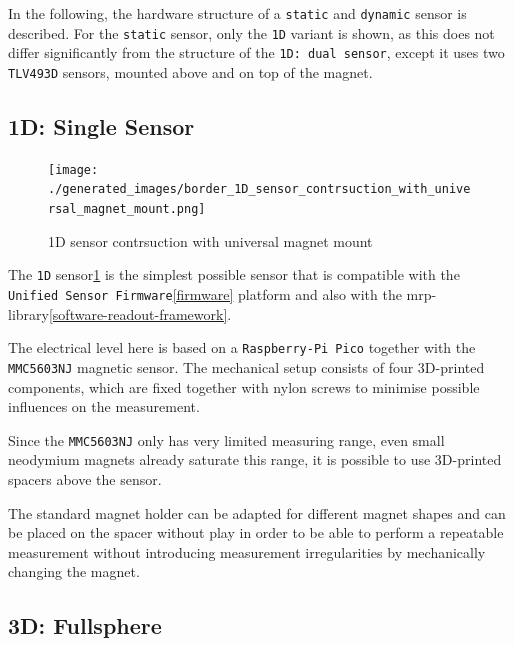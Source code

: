 In the following, the hardware structure of a
\passthrough{\lstinline!static!} and \passthrough{\lstinline!dynamic!}
sensor is described. For the \passthrough{\lstinline!static!} sensor,
only the \passthrough{\lstinline!1D!} variant is shown, as this does not
differ significantly from the structure of the
\passthrough{\lstinline!1D: dual sensor!}, except it uses two
\passthrough{\lstinline!TLV493D!} sensors, mounted above and on top of
the magnet.

\hypertarget{d-single-sensor}{%
\subsection{1D: Single Sensor}\label{d-single-sensor}}

\begin{figure}
\centering
\texttt{[image: ./generated\_images/border\_1D\_sensor\_contrsuction\_with\_universal\_magnet\_mount.png]}
\caption{1D sensor contrsuction with universal magnet mount
\label{1D_sensor_contrsuction_with_universal_magnet_mount.png}}
\end{figure}

The \passthrough{\lstinline!1D!}
sensor\ref{1D_sensor_contrsuction_with_universal_magnet_mount.png} is
the simplest possible sensor that is compatible with the
\passthrough{\lstinline!Unified Sensor Firmware!}\ref{firmware} platform
and also with the \gls{mrp}-library\ref{software-readout-framework}.

The electrical level here is based on a
\passthrough{\lstinline!Raspberry-Pi Pico!} together with the
\passthrough{\lstinline!MMC5603NJ!} magnetic sensor. The mechanical
setup consists of four 3D-printed components, which are fixed together
with nylon screws to minimise possible influences on the measurement.

Since the \passthrough{\lstinline!MMC5603NJ!} only has very limited
measuring range, even small neodymium magnets already saturate this
range, it is possible to use 3D-printed spacers above the sensor.

The standard magnet holder can be adapted for different magnet shapes
and can be placed on the spacer without play in order to be able to
perform a repeatable measurement without introducing measurement
irregularities by mechanically changing the magnet.

\hypertarget{d-fullsphere}{%
\subsection{3D: Fullsphere}\label{d-fullsphere}}


